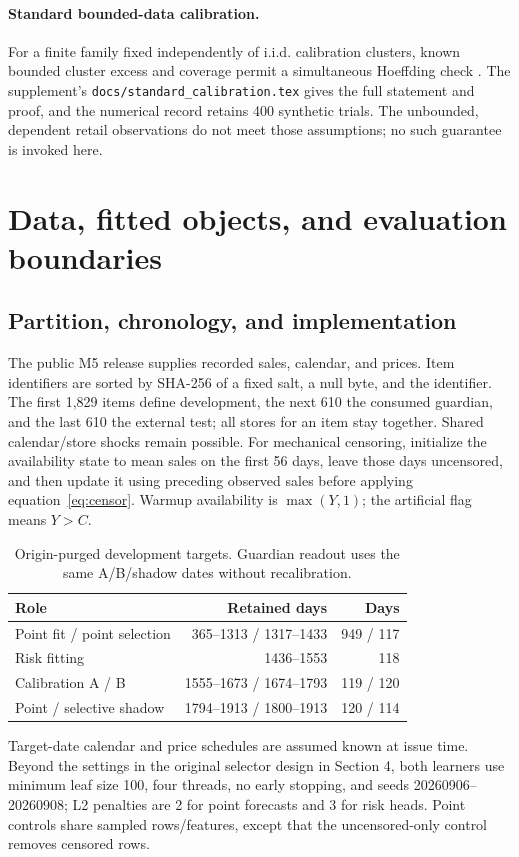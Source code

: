 \paragraph{Standard bounded-data calibration.}\label{app:calibration}
For a finite family fixed independently of i.i.d. calibration clusters, known bounded cluster excess and coverage permit a simultaneous Hoeffding check \citep{hoeffding1963}. The supplement's \texttt{docs/standard\_calibration.tex} gives the full statement and proof, and the numerical record retains 400 synthetic trials. The unbounded, dependent retail observations do not meet those assumptions; no such guarantee is invoked here.

\section{Data, fitted objects, and evaluation boundaries}
\label{app:repro}
\subsection{Partition, chronology, and implementation}
The public M5 release \citep{m5data} supplies recorded sales, calendar, and prices. Item identifiers are sorted by SHA-256 of a fixed salt, a null byte, and the identifier. The first 1,829 items define development, the next 610 the consumed guardian, and the last 610 the external test; all stores for an item stay together. Shared calendar/store shocks remain possible. For mechanical censoring, initialize the availability state to mean sales on the first 56 days, leave those days uncensored, and then update it using preceding observed sales before applying equation~\eqref{eq:censor}. Warmup availability is $\max(Y,1)$; the artificial flag means $Y>C$.

\begin{table}[htbp]
\centering\small
\caption{Origin-purged development targets. Guardian readout uses the same A/B/shadow dates without recalibration.}
\label{tab:chronology}
\begin{tabular}{lrr}\toprule
Role & Retained days & Days\\\midrule
Point fit / point selection & 365--1313 / 1317--1433 & 949 / 117\\
Risk fitting & 1436--1553 & 118\\
Calibration A / B & 1555--1673 / 1674--1793 & 119 / 120\\
Point / selective shadow & 1794--1913 / 1800--1913 & 120 / 114\\
\bottomrule\end{tabular}
\end{table}
Target-date calendar and price schedules are assumed known at issue time. Beyond the settings in the original selector design in Section 4, both learners use minimum leaf size 100, four threads, no early stopping, and seeds 20260906--20260908; L2 penalties are 2 for point forecasts and 3 for risk heads. Point controls share sampled rows/features, except that the uncensored-only control removes censored rows.

